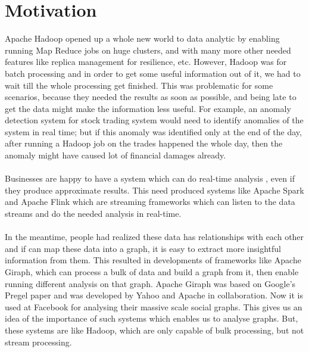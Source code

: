 \documentclass[12pt]{report}
\numberwithin{figure}{section}
\numberwithin{table}{section}
\begin{document}
\section{Motivation}

Apache Hadoop opened up a whole new world to data analytic by enabling running Map Reduce jobs on huge clusters, and with many more other needed features like replica management for resilience, etc. However, Hadoop was for batch processing and in order to get some useful information out of it, we had to wait till the whole processing get finished. This was problematic for some scenarios, because they needed the results as soon as possible, and being late to get the data might make the information less useful. For example, an anomaly detection system for stock trading system would need to identify anomalies of the system in real time; but if this anomaly was identified only at the end of the day, after running a Hadoop job on the trades happened the whole day, then the anomaly might have caused lot of financial damages already. 

\paragraph{}

Businesses are happy to have a system which can do real-time analysis \cite{Vitria}, even if they produce approximate results. This need produced systems like Apache Spark and Apache Flink which are streaming frameworks which can listen to the data streams and do the needed  analysis in real-time. 

\paragraph{}

In the meantime, people had realized these data has relationships with each other and if can map these data into a graph, it is easy to extract more insightful information from them. This resulted in developments of frameworks like Apache Giraph, which can process a bulk of data and build a graph from it, then enable running different analysis on that graph. Apache Giraph was based on Google's Pregel\cite{Pregel} paper and was developed by Yahoo and Apache in collaboration. Now it is used at Facebook\cite{Facebook} for analysing their massive scale social graphs. This gives us an idea of the importance of such systems which enables us to analyse graphs.  But, these systems are like Hadoop, which are only capable of bulk processing, but not stream processing.
\end{document}
